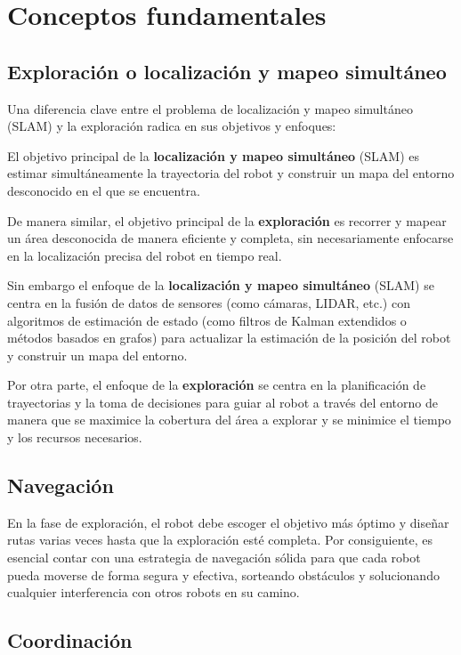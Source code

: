 \section{Conceptos fundamentales} \label{}

\subsection*{Exploración o localización y mapeo simultáneo}

Una diferencia clave entre el problema de localización y mapeo simultáneo (SLAM) y la exploración radica en sus objetivos y enfoques:

El objetivo principal de la \textbf{localización y mapeo simultáneo} (SLAM) es estimar simultáneamente la trayectoria del robot y construir un mapa del entorno desconocido en el que se encuentra.

De manera similar, el objetivo principal de la \textbf{exploración} es recorrer y mapear un área desconocida de manera eficiente y completa, sin necesariamente enfocarse en la localización precisa del robot en tiempo real.

Sin embargo el enfoque de la \textbf{localización y mapeo simultáneo} (SLAM) se centra en la fusión de datos de sensores (como cámaras, LIDAR, etc.) con algoritmos de estimación de estado (como filtros de Kalman extendidos o métodos basados en grafos) para actualizar la estimación de la posición del robot y construir un mapa del entorno.

Por otra parte, el enfoque de la \textbf{exploración} se centra en la planificación de trayectorias y la toma de decisiones para guiar al robot a través del entorno de manera que se maximice la cobertura del área a explorar y se minimice el tiempo y los recursos necesarios.

\subsection*{Navegación}

En la fase de exploración, el robot debe escoger el objetivo más óptimo y diseñar rutas varias veces hasta que la exploración esté completa. Por consiguiente, es esencial contar con una estrategia de navegación sólida para que cada robot pueda moverse de forma segura y efectiva, sorteando obstáculos y solucionando cualquier interferencia con otros robots en su camino.

\subsection*{Coordinación}

